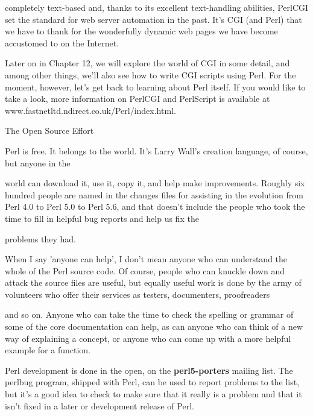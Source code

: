 \documentclass[a4paper,11pt]{book}
\begin{document}
\noindent completely text-based and, thanks to its excellent text-handling abilities, PerlCGI set the standard for web server automation in the past. It's CGI (and Perl) that we have to thank for the wonderfully dynamic web pages we have become accustomed to on the Internet.

\noindent 

\noindent Later on in Chapter 12, we will explore the world of CGI in some detail, and among other things, we'll also see how to write CGI scripts using Perl. For the moment, however, let's get back to learning about Perl itself. If you would like to take a look, more information on PerlCGI and PerlScript is available at www.fastnetltd.ndirect.co.uk/Perl/index.html.

\noindent 

\noindent The Open Source Effort

\noindent 

\noindent Perl is free.  It  belongs  to  the  world.  It's  Larry Wall's creation  language,  of  course,  but  anyone  in  the

\noindent world  can  download it,  use  it,  copy  it,  and  help  make  improvements.  Roughly  six  hundred  people  are named in the  changes files for  assisting in the evolution  from  Perl  4.0 to  Perl  5.0 to  Perl  5.6,  and  that doesn't  include the people who  took  the  time  to  fill  in  helpful  bug  reports  and  help  us  fix  the

\noindent problems they had.

\noindent 

\noindent When I say 'anyone can help', I don't mean anyone who can understand the whole of the Perl source code. Of course, people who can knuckle down and attack the source files are useful, but equally useful work is done by the army of volunteers who offer their services as testers, documenters, proofreaders

\noindent and so on. Anyone who can take the time to check the spelling or grammar of some of the core documentation can help, as can anyone who can think of a new way of explaining a concept, or anyone who can come up with a more helpful example for a function.

\noindent 

\noindent Perl development  is done  in the  open,  on  the  \textbf{perl5-porters  }mailing  list.  The perlbug program, shipped with Perl,  can be used  to  report  problems  to  the  list,  but it's  a  good idea  to  check  to make sure that it really is a problem and that it isn't fixed in a later or development release of Perl.
\end{document}
